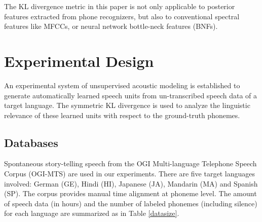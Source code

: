 \documentclass[a4paper]{article}
\begin{document}
The KL divergence metric in this paper is not only applicable to posterior features extracted from phone recognizers, but also to conventional spectral features like MFCCs, or neural network bottle-neck features (BNFs). 
\section{Experimental Design}

An experimental system of unsupervised acoustic modeling is established to generate automatically learned speech units from un-transcribed speech data of a target language. The symmetric KL divergence is used to analyze the linguistic relevance of these learned units with respect to the ground-truth phonemes.
\subsection{Databases}
Spontaneous story-telling speech from the OGI Multi-language Telephone Speech Corpus (OGI-MTS) \cite{MuthusamyColeOshika1992} are used in our experiments. There are five target languages involved: German (GE), Hindi (HI), Japanese (JA), Mandarin (MA) and Spanish (SP). The corpus provides manual time alignment at phoneme level. The amount of speech data (in hours) and the number of labeled phonemes (including silence) for each language are summarized as in Table \ref{datasize}.

\begin{table}[htbp]
\renewcommand\arraystretch{1}
\centering
\caption{Multi-lingual speech data from the OGI-MTS corpus}
\label{datasize}
\end{table}
\end{document}
